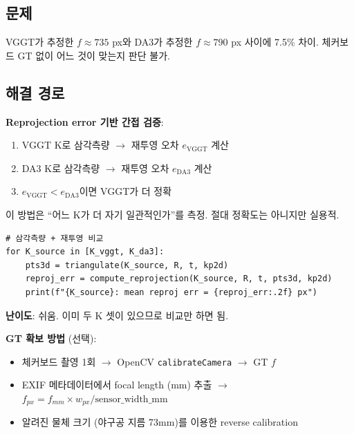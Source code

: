 \documentclass[11pt, a4paper]{report}
\begin{document}
\subsection{문제}
VGGT가 추정한 $f \approx 735$ px와 DA3가 추정한 $f \approx 790$ px 사이에 7.5\% 차이. 체커보드 GT 없이 어느 것이 맞는지 판단 불가.

\subsection{해결 경로}

\begin{mathbox}
\textbf{Reprojection error 기반 간접 검증}:
\begin{enumerate}[leftmargin=*]
  \item VGGT K로 삼각측량 $\rightarrow$ 재투영 오차 $e_\text{VGGT}$ 계산
  \item DA3 K로 삼각측량 $\rightarrow$ 재투영 오차 $e_\text{DA3}$ 계산
  \item $e_\text{VGGT} < e_\text{DA3}$이면 VGGT가 더 정확
\end{enumerate}
이 방법은 ``어느 K가 더 자기 일관적인가''를 측정. 절대 정확도는 아니지만 실용적.
\end{mathbox}

\begin{devbox}
\begin{verbatim}
# 삼각측량 + 재투영 비교
for K_source in [K_vggt, K_da3]:
    pts3d = triangulate(K_source, R, t, kp2d)
    reproj_err = compute_reprojection(K_source, R, t, pts3d, kp2d)
    print(f"{K_source}: mean reproj err = {reproj_err:.2f} px")
\end{verbatim}
\textbf{난이도}: 쉬움. 이미 두 K 셋이 있으므로 비교만 하면 됨.
\end{devbox}

\begin{dataneedbox}
\textbf{GT 확보 방법} (선택):
\begin{itemize}[leftmargin=*]
  \item 체커보드 촬영 1회 $\rightarrow$ OpenCV \texttt{calibrateCamera} $\rightarrow$ GT $f$
  \item EXIF 메타데이터에서 focal length (mm) 추출 $\rightarrow$ $f_{px} = f_{mm} \times w_{px} / \text{sensor\_width\_mm}$
  \item 알려진 물체 크기 (야구공 지름 73mm)를 이용한 reverse calibration
\end{itemize}
\end{dataneedbox}


\end{document}

